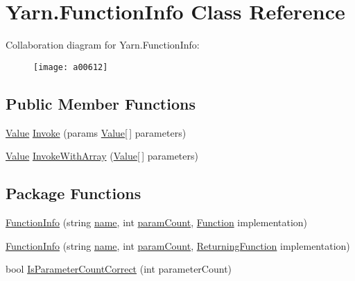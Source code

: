 \hypertarget{a00103}{\section{Yarn.\-Function\-Info Class Reference}
\label{a00103}
}


Collaboration diagram for Yarn.\-Function\-Info\-:
\nopagebreak
\begin{figure}[H]
\begin{center}
\leavevmode
\texttt{[image: a00612]}
\end{center}
\end{figure}
\subsection*{Public Member Functions}
\begin{DoxyCompactItemize}
\item 
\hyperlink{a00167}{Value} \hyperlink{a00103_ab400ac66785d7df2e3fc0f3ce3796044}{Invoke} (params \hyperlink{a00167}{Value}\mbox{[}$\,$\mbox{]} parameters)
\item 
\hyperlink{a00167}{Value} \hyperlink{a00103_a3ce11058d35232907a738de4bb094c67}{Invoke\-With\-Array} (\hyperlink{a00167}{Value}\mbox{[}$\,$\mbox{]} parameters)
\end{DoxyCompactItemize}
\subsection*{Package Functions}
\begin{DoxyCompactItemize}
\item 
\hyperlink{a00103_a93457cd0e838cb2ef59cc2a3a46ce758}{Function\-Info} (string \hyperlink{a00103_adb38e83e3c1597b553aeff14bef5bfcb}{name}, int \hyperlink{a00103_aa8527de9e4f153b05164ccaf167c3186}{param\-Count}, \hyperlink{a00050_ae0be2e5cf13d5779816102439e61ff1a}{Function} implementation)
\item 
\hyperlink{a00103_a41d97c09da25caede70cb734d18113b9}{Function\-Info} (string \hyperlink{a00103_adb38e83e3c1597b553aeff14bef5bfcb}{name}, int \hyperlink{a00103_aa8527de9e4f153b05164ccaf167c3186}{param\-Count}, \hyperlink{a00050_a5177bf74fbfe7303fac9d8236c2e514b}{Returning\-Function} implementation)
\item 
bool \hyperlink{a00103_a1ed09ff8aafa230a0d2bbc23cd6cd763}{Is\-Parameter\-Count\-Correct} (int parameter\-Count)
\end{DoxyCompactItemize}
